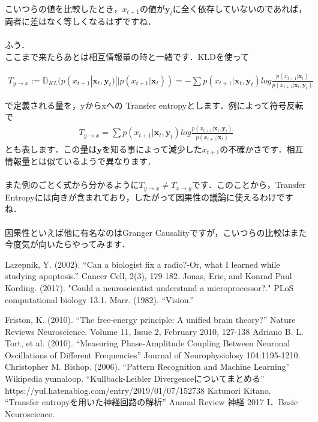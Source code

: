 \documentclass[11pt,a4paper]{jsarticle}                    %
\begin{document}
こいつらの値を比較したとき，$x_{t+1}$の値が$\mathbf{y}_t$に全く依存していないのであれば，両者に差はなく等しくなるはずですね．\\
\\
ふう．
\\
ここまで来たらあとは相互情報量の時と一緒です．KLDを使って

\begin{eqnarray}
\label{eq:TE1}
  T_{y\rightarrow x} := \mathbb{D}_{KL}(p(x_{t+1}| \mathbf{x}_t, \mathbf{y}_t) || p(x_{t+1}| \mathbf{x}_t)) = -\sum p(x_{t+1}| \mathbf{x}_t, \mathbf{y}_t) log \frac{p(x_{t+1}| \mathbf{x}_t)}{p(x_{t+1}| \mathbf{x}_t, \mathbf{y}_t)} 
\end{eqnarray}

で定義される量を，yからxへの Transfer entropyとします．例によって符号反転で
\begin{eqnarray}
\label{eq:TE2}
  T_{y\rightarrow x} = \sum p(x_{t+1}| \mathbf{x}_t, \mathbf{y}_t) log \frac{p(x_{t+1}| \mathbf{x}_t, \mathbf{y}_t)}{p(x_{t+1}| \mathbf{x}_t)} 
\end{eqnarray}
とも表します．この量は$\mathbf{y}$を知る事によって減少した$x_{t+1}$の不確かさです．相互情報量とは似ているようで異なります．\\
\\
また例のごとく式から分かるように$T_{y\rightarrow x} \neq T_{x\rightarrow y}$です．このことから，Transfer Entropyには向きが含まれており，したがって因果性の議論に使えるわけですね\cite{kitano}．\\
\\
因果性といえば他に有名なのはGranger Causalityですが，こいつらの比較はまた今度気が向いたらやってみます．

\begin{thebibliography}{99}
  Lazepnik, Y. (2002). ``Can a biologist fix a radio?-Or, what I learned while studying apoptosis.'' Cancer Cell, 2(3), 179-182.
  Jonas, Eric, and Konrad Paul Kording. (2017). "Could a neuroscientist understand a microprocessor?." PLoS computational biology 13.1.
  Marr. (1982). ``Vision.'' 
 
  Friston, K. (2010). ``The free-energy principle: A unified brain theory?'' Nature Reviews Neuroscience. Volume 11, Issue 2, February 2010, 127-138
  Adriano B. L. Tort, et al. (2010). ``Measuring Phase-Amplitude Coupling Between Neuronal Oscillations of Different Frequencies'' Journal of Neurophysiolosy 104:1195-1210.
  Christopher M. Bishop. (2006). ``Pattern Recognition and Machine Learning''
  Wikipedia
  yumaloop. ``Kullback-Leibler Divergenceについてまとめる'' https://yul.hatenablog.com/entry/2019/01/07/152738
  Katunori Kitano. ``Transfer entropyを用いた神経回路の解析'' Annual Review 神経 2017 I．Basic Neuroscience.
\end{thebibliography}
\end{document}
